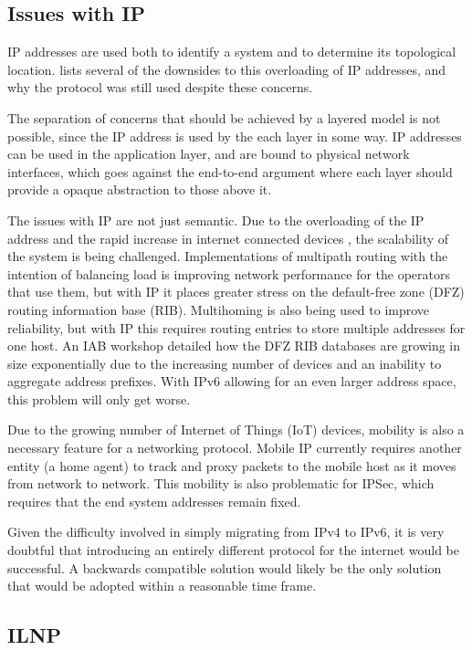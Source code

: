 \documentclass[12pt]{article}
\begin{document}
\subsection{Issues with IP}

IP addresses are used both to identify a system and to determine its topological location. \cite{briancarpenter2014} lists several of the downsides to this overloading of IP addresses, and why the protocol was still used despite these concerns. 

The separation of concerns that should be achieved by a layered model is not possible, since the IP address is used by the each layer in some way. IP addresses can be used in the application layer, and are bound to physical network interfaces, which goes against the end-to-end argument where each layer should provide a opaque abstraction to those above it.

The issues with IP are not just semantic. Due to the overloading of the IP address and the rapid increase in internet connected devices \cite{iot_stat}, the scalability of the system is being challenged. Implementations of multipath routing with the intention of balancing load is improving network performance for the operators that use them, but with IP it places greater stress on the default-free zone (DFZ) routing information base (RIB). Multihoming is also being used to improve reliability, but with IP this requires routing entries to store multiple addresses for one host. An IAB workshop \cite{rfc4984} detailed how the DFZ RIB databases are growing in size exponentially due to the increasing number of devices and an inability to aggregate address prefixes. With IPv6 allowing for an even larger address space, this problem will only get worse. 

Due to the growing number of Internet of Things (IoT) devices, mobility is also a necessary feature for a networking protocol. Mobile IP currently requires another entity (a home agent) to track and proxy packets to the mobile host as it moves from network to network. This mobility is also problematic for IPSec, which requires that the end system addresses remain fixed.

Given the difficulty involved in simply migrating from IPv4 to IPv6, it is very doubtful that introducing an entirely different protocol for the internet would be successful. A backwards compatible solution would likely be the only solution that would be adopted within a reasonable time frame.

\subsection{ILNP}
\end{document}
